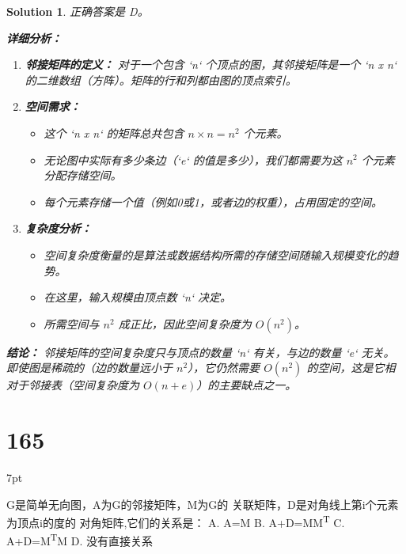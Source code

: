 \documentclass[UTF8]{report}
\newtheorem{solution}{Solution}
\theoremstyle{MyLineTheoremStyle} %
\theoremstyle{MyBlockTheoremStyle} %
\theoremstyle{MySubsubsectionStyle} %
\newenvironment{graybox}{%
        \def\FrameCommand{%
        \hspace{1pt}%
        {\color{gray}\small \vrule width 2pt}%
        {\color{graybox_color}\vrule width 4pt}%
        \colorbox{graybox_color}%
        }%
        \MakeFramed{\advance\hsize-\width\FrameRestore}%
        \noindent\hspace{-4.55pt}%
        \begin{adjustwidth}{}{7pt}%
        \vspace{2pt}\vspace{2pt}%
        }
        {%
        \vspace{2pt}\end{adjustwidth}\endMakeFramed%
        }
\begin{document}
\begin{solution}
正确答案是 D。

\textbf{详细分析：}

\begin{enumerate}
    \item \textbf{邻接矩阵的定义：}
    对于一个包含 `n` 个顶点的图，其邻接矩阵是一个 `n x n` 的二维数组（方阵）。矩阵的行和列都由图的顶点索引。

    \item \textbf{空间需求：}
    \begin{itemize}
        \item 这个 `n x n` 的矩阵总共包含 $n \times n = n^2$ 个元素。
        \item 无论图中实际有多少条边（`e` 的值是多少），我们都需要为这 $n^2$ 个元素分配存储空间。
        \item 每个元素存储一个值（例如0或1，或者边的权重），占用固定的空间。
    \end{itemize}

    \item \textbf{复杂度分析：}
    \begin{itemize}
        \item 空间复杂度衡量的是算法或数据结构所需的存储空间随输入规模变化的趋势。
        \item 在这里，输入规模由顶点数 `n` 决定。
        \item 所需空间与 $n^2$ 成正比，因此空间复杂度为 $O(n^2)$。
    \end{itemize}
\end{enumerate}

\textbf{结论：}
邻接矩阵的空间复杂度只与顶点的数量 `n` 有关，与边的数量 `e` 无关。即使图是稀疏的（边的数量远小于 $n^2$），它仍然需要 $O(n^2)$ 的空间，这是它相对于邻接表（空间复杂度为 $O(n+e)$）的主要缺点之一。
\end{solution}


\section*{165}
\begin{graybox}
G是简单无向图，A为G的邻接矩阵，M为G的
关联矩阵，D是对角线上第i个元素为顶点i的度的
对角矩阵,它们的关系是：
A. A=M
B. A+D=MM\textsuperscript{T}
C. A+D=M\textsuperscript{T}M
D. 没有直接关系
\end{graybox}
\end{document}
